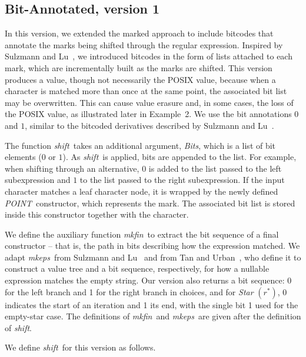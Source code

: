 \documentclass[12pt]{article}
\newcommand{\shift}{\textit{shift}}
\newcommand{\mkeps}{\textit{mkeps}}
\newcommand{\Bits}{\textit{Bits}}
\newcommand{\POINT}{\textit{POINT}}
\newcommand{\mkfin}{\textit{mkfin}}
\newcommand{\STARText}{\textit{Star} $(r^*)$}
\begin{document}
\FloatBarrier
\subsection{Bit-Annotated, version 1}

In this version, we extended the marked approach to include bitcodes that annotate the marks being 
shifted through the regular expression. Inspired by Sulzmann and Lu~\cite{Sulzmann2014}, we introduced bitcodes in the form 
of lists attached to each mark, which are incrementally built as the marks are shifted.  
This version produces a value, though not necessarily the POSIX value, because when a character is matched 
more than once at the same point, the associated bit list may be overwritten.  
This can cause value erasure and, in some cases, the loss of the POSIX value, as illustrated later in Example~2.  
We use the bit annotations $0$ and $1$, similar to the bitcoded derivatives described by Sulzmann and Lu~\cite{Sulzmann2014}.  

The function \shift\ takes an additional argument, \Bits, which is a list of bit elements ($0$ or $1$).  
As \shift\ is applied, bits are appended to the list.  
For example, when shifting through an alternative, $0$ is added to the list passed to the left subexpression 
and $1$ to the list passed to the right subexpression.  
If the input character matches a leaf character node, it is wrapped by the newly defined \POINT\ constructor, 
which represents the mark.  
The associated bit list is stored inside this constructor together with the character.  

We define the auxiliary function \mkfin\ to extract the bit sequence of a final constructor -- 
that is, the path in bits describing how the expression matched.  
We adapt \mkeps\ from Sulzmann and Lu~\cite{Sulzmann2014} and from Tan and Urban~\cite{TanAndUrban2023}, 
who define it to construct a value tree and a bit sequence, respectively, 
for how a nullable expression matches the empty string.  
Our version also returns a bit sequence: 0 for the left branch and 1 for the right branch in choices, 
and for \STARText, 0 indicates the start of an iteration and 1 its end, 
with the single bit 1 used for the empty-star case.  
The definitions of \mkfin\ and \mkeps\ are given after the definition of \shift.  

We define \shift\ for this version as follows. 
 
\end{document}
